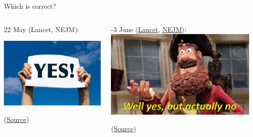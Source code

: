 \documentclass{beamer}
\begin{document}
\begin{frame}{Which is correct?}
\begin{columns}
\begin{column}{.5\textwidth}
22 May (Lancet, NEJM):

\includegraphics[trim=0 7mm 0 9mm,clip, width=\linewidth]{images/yes}

(\href{https://www.theguardian.com/world/2020/jun/03/covid-19-surgisphere-who-world-health-organization-hydroxychloroquine}{Source})
\end{column}

\begin{column}{.5\textwidth}
-3 June (\href{https://www.thelancet.com/journals/lanpub/article/PIIS0140-6736(20)31290-3/fulltext}{Lancet}, \href{https://www.nejm.org/doi/full/10.1056/NEJMe2020822?query=featured\%E2\%80\%94coronavirus}{NEJM}):
\includegraphics[width=\linewidth]{images/actually}

(\href{https://www.theguardian.com/world/2020/jun/03/how-were-medical-journals-and-who-caught-out-over-hydroxychloroquine}{Source})
\end{column}
\end{columns}

\end{frame}
\end{document}

